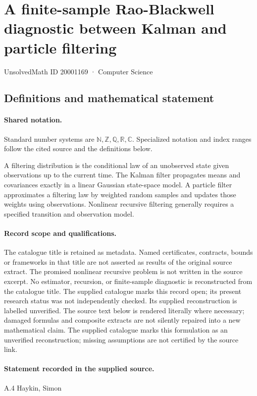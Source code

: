 \documentclass[11pt]{article}
\begin{document}
\setcounter{section}{20001168}
\section{A finite-sample Rao-Blackwell diagnostic between Kalman and particle filtering}\label{20001169}
{\small\sffamily UnsolvedMath ID 20001169 · Computer Science}
\subsection{Definitions and mathematical statement}

\paragraph{Shared notation.}Standard number systems are $\mathbb N,\mathbb Z,\mathbb Q,\mathbb R,\mathbb C$. Specialized notation and index ranges follow the cited source and the definitions below.


A filtering distribution is the conditional law of an unobserved state given observations up to the current time. The Kalman filter propagates means and covariances exactly in a linear Gaussian state-space model. A particle filter approximates a filtering law by weighted random samples and updates those weights using observations. Nonlinear recursive filtering generally requires a specified transition and observation model.
\paragraph{Record scope and qualifications.}
The catalogue title is retained as metadata. Named certificates, contracts, bounds or frameworks in that title are not asserted as results of the original source extract.
The promised nonlinear recursive problem is not written in the source excerpt. No estimator, recursion, or finite-sample diagnostic is reconstructed from the catalogue title. The supplied catalogue marks this record open; its present research status was not independently checked. Its supplied reconstruction is labelled unverified.
The source text below is rendered literally where necessary; damaged formulas and composite extracts are not silently repaired into a new mathematical claim.
The supplied catalogue marks this formulation as an unverified reconstruction; missing assumptions are not certified by the source link.
\paragraph{Statement recorded in the supplied source.}
A.4 Haykin, Simon
\end{document}
